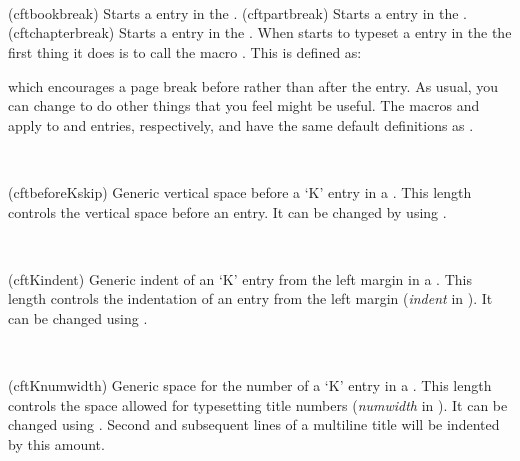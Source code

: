 \begin{syntax}
\cmd{\cftbookbreak} \\
\cmd{\cftpartbreak} \\
\cmd{\cftchapterbreak} \\
\end{syntax}
\glossary(cftbookbreak)%
  {}%
  {Starts a  entry in the \prtoc.}
\glossary(cftpartbreak)%
  {}%
  {Starts a  entry in the \prtoc.}
\glossary(cftchapterbreak)%
  {}%
  {Starts a  entry in the \prtoc.}
When \cmd{\l@book} starts to typeset a \cmd{\book} entry in the
\toc{} the first thing it does is to call the macro \cmd{\cftbookbreak}.
This is defined as:
\begin{lcode}
\newcommand{\cftbookbreak}{\addpenalty{-\@highpenalty}}
\end{lcode}
which encourages a page break before rather than after the entry. As usual,
you can change \cmd{\cftbookbreak} to do other things that you feel might
be useful. The macros \cmd{\cftpartbreak} and \cmd{\cftchapterbreak} apply
to \cmd{\part} and \cmd{\chapter} entries, respectively, and have the same
default definitions as \cmd{\cftbookbreak}.

\begin{syntax}
\lnc{\cftbeforeKskip} \\
\end{syntax}
\glossary(cftbeforeKskip)%
  {}%
  {Generic vertical space before a `K' entry in a \listofx.}
 This length controls the vertical space before an entry. It can be changed
 by using \cmd{\setlength}. 

\begin{syntax}
\lnc{\cftKindent} \\
\end{syntax}
\glossary(cftKindent)%
  {}%
  {Generic indent of an `K' entry from the left margin in a \listofx.}
 This length controls the indentation of an entry from the left 
margin (\textit{indent} in ). It
 can be changed using \cmd{\setlength}. 

\begin{syntax}
\lnc{\cftKnumwidth} \\
\end{syntax}
\glossary(cftKnumwidth)%
  {}%
  {Generic space for the number of a `K' entry in a \listofx.}
 This length controls the space allowed for typesetting title numbers 
 (\textit{numwidth} in ). It can
 be changed using \cmd{\setlength}. Second and subsequent lines of a multiline
 title will be indented by this amount.

